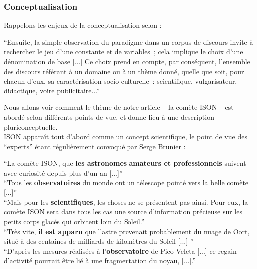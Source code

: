 \documentclass[a4paper,10pt]{article}
\begin{document}
		\subsubsection{Conceptualisation}
			Rappelons les enjeux de la conceptualisation selon \cite{Mortureux1993} :
			\begin{center}
				\footnotesize
				\begin{minipage}{0.7\textwidth}
					``Ensuite, la simple observation du paradigme dans un corpus de discours invite à rechercher le jeu d'une constante et de variables ; cela implique le choix d'une dénomination de base [...] Ce choix prend en compte, par conséquent, l'ensemble des discours référant à un domaine ou à un thème donné, quelle que soit, pour chacun d'eux, sa caractérisation socio-culturelle : scientifique, vulgarisateur, didactique, voire publicitaire...'' 
				\end{minipage}
			\end{center}
			Nous allons voir comment le thème de notre article -- la comète ISON -- est abordé selon différents points de vue, et donne lieu à une description pluriconceptuelle.\\
			ISON apparaît tout d'abord comme un concept scientifique, le point de vue des ``experts'' étant régulièrement convoqué par Serge Brunier :
			\begin{center}
				\footnotesize
				\begin{minipage}{0.7\textwidth}
					``La comète ISON, que \textbf{les astronomes amateurs et professionnels} suivent avec curiosité depuis plus d'un an [...]''\\
					``Tous les \textbf{observatoires} du monde ont un télescope pointé vers la belle comète [...]'' \\
					``Mais pour les \textbf{scientifiques}, les choses ne se présentent pas ainsi. Pour eux, la comète ISON sera dans tous les cas une source d'information précieuse sur les petits corps glacés qui orbitent loin du Soleil.'' \\
					``Très vite, \textbf{il est apparu} que l'astre provenait probablement du nuage de Oort, situé à des centaines de milliards de kilomètres du Soleil [...] ''\\
					``D'après les mesures réalisées à l'\textbf{observatoire} de Pico Veleta [...] ce regain d'activité pourrait être lié à une fragmentation du noyau, [...].''
				\end{minipage}
			\end{center}
\end{document}
